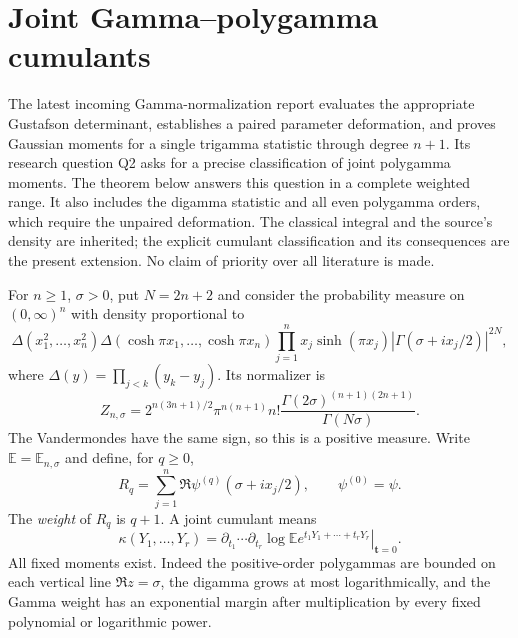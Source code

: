 \section{Joint Gamma--polygamma cumulants}
\label{gc:section}

The latest incoming Gamma-normalization report \cite{GammaIncoming} evaluates the appropriate
Gustafson determinant, establishes a paired parameter deformation, and
proves Gaussian moments for a single trigamma statistic through degree
$n+1$. Its research question Q2 asks for a precise classification of
joint polygamma moments. The theorem below answers this question in a
complete weighted range. It also includes the digamma statistic and all
even polygamma orders, which require the unpaired deformation.
The classical integral and the source's density are inherited; the
explicit cumulant classification and its consequences are the present
extension. No claim of priority over all literature is made.

For $n\ge1$, $\sigma>0$, put $N=2n+2$ and consider the probability
measure on $(0,\infty)^n$ with density proportional to
\begin{equation}\label{gc:density}
 \Delta(x_1^2,\ldots,x_n^2)
 \Delta(\cosh\pi x_1,\ldots,\cosh\pi x_n)
 \prod_{j=1}^n x_j\sinh(\pi x_j)
       |\Gamma(\sigma+ix_j/2)|^{2N},
\end{equation}
where $\Delta(y)=\prod_{j<k}(y_k-y_j)$. Its normalizer is
\begin{equation}\label{gc:normalizer}
 Z_{n,\sigma}
 =2^{n(3n+1)/2}\pi^{n(n+1)}n!
       \frac{\Gamma(2\sigma)^{(n+1)(2n+1)}}{\Gamma(N\sigma)}.
\end{equation}
The Vandermondes have the same sign, so this is a positive measure.
Write $\mathbb E=\mathbb E_{n,\sigma}$ and define, for $q\ge0$,
\begin{equation}\label{gc:R}
 R_q=\sum_{j=1}^n\Re\psi^{(q)}(\sigma+ix_j/2),
 \qquad \psi^{(0)}=\psi.
\end{equation}
The \emph{weight} of $R_q$ is $q+1$. A joint cumulant means
\[
 \kappa(Y_1,\ldots,Y_r)
 =\left.\partial_{t_1}\cdots\partial_{t_r}
     \log\mathbb E e^{t_1Y_1+\cdots+t_rY_r}\right|_{\mathbf t=0}.
\]
All fixed moments exist. Indeed the positive-order polygammas are bounded
on each vertical line $\Re z=\sigma$, the digamma grows at most
logarithmically, and the Gamma weight has an exponential margin after
multiplication by every fixed polynomial or logarithmic power.

